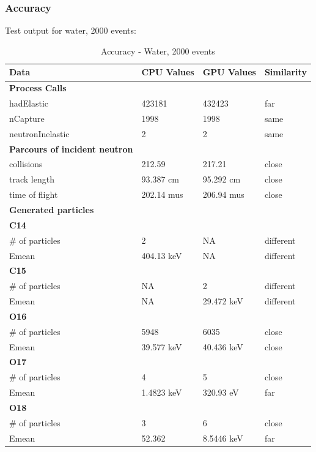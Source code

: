 \documentclass[12pt]{article}
\begin{document}
	\subsubsection{Accuracy}
	Test output for water, 2000 events:
		\begin{table}[H]
		\centering
		\caption{Accuracy - Water, 2000 events}\label{sys1Acc}
		\begin{tabular}{lp{2.3cm}p{2.3cm}l}
		\toprule
		\bf Data & \bf CPU Values & \bf GPU Values & \bf Similarity\\\midrule
		\bf Process Calls&&&\\
		hadElastic&423181&432423&far\\
		nCapture&1998&1998&same\\
		neutronInelastic&2&2&same\\ 

		\midrule
		\bf Parcours of incident neutron&&&\\
		collisions&212.59&217.21&close\\
		track length&93.387 cm&95.292 cm&close\\
		time of flight&202.14 mus&206.94 mus&close\\
	
		\midrule
		\bf Generated particles&&&\\

		\bf{C14}&&&\\
		\# of particles&2&NA&different\\
		Emean&404.13 keV&NA&different\\

		\bf{C15}&&&\\
		\# of particles&NA&2&different\\
		Emean&NA&29.472 keV&different\\

		\bf{O16}&&&\\
		\# of particles&5948&6035&close\\
		Emean&39.577 keV&40.436 keV&close\\
		
		\bf{O17}&&&\\
		\# of particles&4&5&close\\
		Emean&1.4823 keV&320.93 eV&far\\
		
		\bf{O18}&&&\\
		\# of particles&3&6&close\\
		Emean&52.362&8.5446 keV&far\\
		

\end{tabular}
\end{table}
\end{document}
